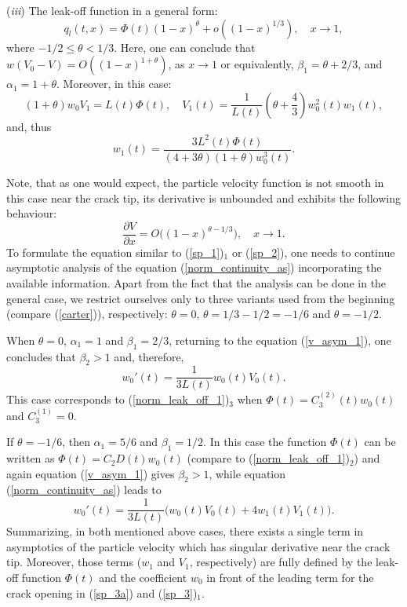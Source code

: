 (\emph{iii})
The leak-off function in a general form:
\[
q_l(t,x)=\Phi(t)(1-x)^{\theta}+o((1-x)^{1/3}),\quad x\to1,
\]
where $-1/2\le \theta<1/3$. Here, one can conclude that $w(V_0-V)=O((1-x)^{1+\theta})$, as $x\to1$ or equivalently, $\beta_1=\theta+2/3$, and $\alpha_1=1+\theta$. Moreover, in this case:
\begin{equation}
(1+\theta)w_0V_1=L(t)\Phi(t), \quad V_{1}(t)=\frac{1}{L(t)}\left(\theta+\frac{4}{3}\right) w_{0}^{2}(t) w_{1}(t),
\label{sp_3}
\end{equation}
and, thus
\begin{equation}
w_{1}(t)=\frac{3L^2(t)\Phi(t)}{(4+3\theta)(1+\theta)w_{0}^{3}(t)}.
\label{sp_3a}
\end{equation}

Note, that as one would expect, the particle velocity function is not smooth in this case near the crack tip, its derivative is unbounded and exhibits the following behaviour:
\[
\frac{\partial V}{\partial x}=O\big((1-x)^{\theta-1/3}\big), \quad x\to1.
\]
To formulate the equation similar to (\ref{sp_1})$_1$ or (\ref{sp_2}), one needs to continue asymptotic analysis of the equation (\ref{norm_continuity_as}) incorporating the available information.
Apart from the fact that the analysis can be done in the general case, we restrict ourselves only to three variants used from the beginning (compare (\ref{carter})), respectively:
$\theta=0$, $\theta=1/3-1/2=-1/6$ and $\theta=-1/2$.





When $\theta=0$, $\alpha_1=1$ and $\beta_1=2/3$, returning to the equation (\ref{v_asym_1}), one concludes that $\beta_2>1$ and, therefore,
\begin{equation}
w_{0}'(t)= \frac{1}{3L(t)} w_0(t)V_0(t).
\label{sp_4}
\end{equation}
This case corresponds to (\ref{norm_leak_off_1})$_3$ when $\Phi(t)=C_3^{(2)}(t)w_0(t)$ and $C_3^{(1)}=0$.






If $\theta=-1/6$, then $\alpha_1=5/6$ and $\beta_1=1/2$. In this case the function $\Phi(t)$ can be written as $\Phi(t)=C_2 D(t)w_0(t)$ (compare to (\ref{norm_leak_off_1})$_2$)
and again equation (\ref{v_asym_1}) gives $\beta_2>1$, while equation (\ref{norm_continuity_as}) leads to
\begin{equation}
w_{0}'(t)= \frac{1}{3L(t)} \big(w_0(t)V_0(t)+4w_1(t)V_1(t)\big).
\label{sp_5}
\end{equation}
Summarizing, in both mentioned above cases, there exists a single term in asymptotics of the particle velocity which has singular derivative near the crack tip. Moreover, those terms ($w_1$ and $V_1$, respectively) are fully defined by the leak-off function $\Phi(t)$ and the coefficient $w_0$ in front of the leading term for the crack opening in (\ref{sp_3a}) and (\ref{sp_3})$_1$.

